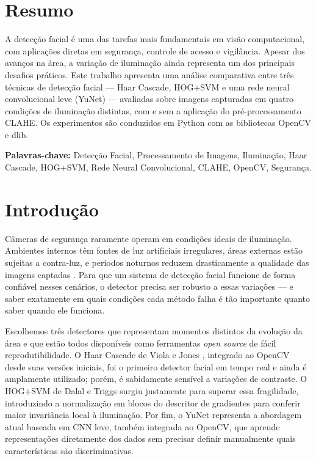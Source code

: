 \documentclass[conference]{IEEEtran}
\begin{document}
\section*{Resumo}
A detec\c{c}\~ao facial \'e uma das tarefas mais fundamentais em vis\~ao computacional, com aplica\c{c}\~oes diretas em seguran\c{c}a, controle de acesso e vigil\^ancia. Apesar dos avan\c{c}os na \'area, a varia\c{c}\~ao de ilumina\c{c}\~ao ainda representa um dos principais desafios pr\'aticos. Este trabalho apresenta uma an\'alise comparativa entre tr\^es t\'ecnicas de detec\c{c}\~ao facial --- Haar Cascade, HOG+SVM e uma rede neural convolucional leve (YuNet) --- avaliadas sobre imagens capturadas em quatro condi\c{c}\~oes de ilumina\c{c}\~ao distintas, com e sem a aplica\c{c}\~ao do pr\'e-processamento CLAHE. Os experimentos s\~ao conduzidos em Python com as bibliotecas OpenCV e dlib.

\noindent\textbf{Palavras-chave:} Detec\c{c}\~ao Facial, Processamento de Imagens, Ilumina\c{c}\~ao, Haar Cascade, HOG+SVM, Rede Neural Convolucional, CLAHE, OpenCV, Seguran\c{c}a.

\section{Introdu\c{c}\~ao}

C\^ameras de seguran\c{c}a raramente operam em condi\c{c}\~oes ideais de ilumina\c{c}\~ao. Ambientes internos t\^em fontes de luz artificiais irregulares, \'areas externas est\~ao sujeitas a contra-luz, e per\'iodos noturnos reduzem drasticamente a qualidade das imagens captadas \cite{Adini1997}. Para que um sistema de detec\c{c}\~ao facial funcione de forma confi\'avel nesses cen\'arios, o detector precisa ser robusto a essas varia\c{c}\~oes --- e saber exatamente em quais condi\c{c}\~oes cada m\'etodo falha \'e t\~ao importante quanto saber quando ele funciona.

Escolhemos tr\^es detectores que representam momentos distintos da evolu\c{c}\~ao da \'area e que est\~ao todos dispon\'iveis como ferramentas \textit{open source} de f\'acil reprodutibilidade. O Haar Cascade de Viola e Jones \cite{ViolaJones2001}, integrado ao OpenCV desde suas vers\~oes iniciais, foi o primeiro detector facial em tempo real e ainda \'e amplamente utilizado; por\'em, \'e sabidamente sens\'ivel a varia\c{c}\~oes de contraste. O HOG+SVM de Dalal e Triggs \cite{DalalTriggs2005} surgiu justamente para superar essa fragilidade, introduzindo a normaliza\c{c}\~ao em blocos do descritor de gradientes para conferir maior invari\^ancia local \`a ilumina\c{c}\~ao. Por fim, o YuNet \cite{Wu2023} representa a abordagem atual baseada em CNN leve, tamb\'em integrada ao OpenCV, que aprende representa\c{c}\~oes diretamente dos dados sem precisar definir manualmente quais caracter\'isticas s\~ao discriminativas.
\end{document}
